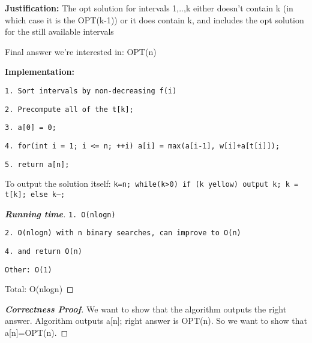 \documentclass[openany]{article}
\begin{document}
\begin{solution*}{}
    \textbf{Justification:} The opt solution for intervals 1,..,k either doesn't contain k (in which case it is the OPT(k-1)) or it does contain k, and includes the opt solution for the still available intervals

    Final answer we're interested in: OPT(n)

    \textbf{Implementation:}

    \qquad \texttt{1. Sort intervals by non-decreasing f(i)}
    
    \qquad \texttt{2. Precompute all of the t[k];}
    
    \qquad \texttt{3. a[0] = 0;}
    
    \qquad \texttt{4. for(int i = 1; i <= n; ++i) a[i] = max(a[i-1], w[i]+a[t[i]]);}
    
    \qquad \texttt{5. return a[n];}

    To output the solution itself:
    \texttt{k=n; while(k>0) if (k yellow) {output k; k = t[k];} else k--;}
    

    
\end{solution*}

    \begin{proof}[\textbf{Running time}]{}
    \renewcommand{\qedsymbol}{}
    
        \qquad \texttt{1. O(nlogn)}
        
        \qquad \texttt{2. O(nlogn) with n binary searches, can improve to O(n)}
        
        \qquad \texttt{4. and return O(n)}
        
        \qquad \texttt{Other: O(1)}

        Total: O(nlogn)
    \end{proof}

    \begin{proof}[\textbf{Correctness Proof}]{}
    \renewcommand{\qedsymbol}{}
        We want to show that the algorithm outputs the right answer. Algorithm outputs a[n]; right answer is OPT(n). So we want to show that a[n]=OPT(n).

        
    \end{proof}
\end{document}
